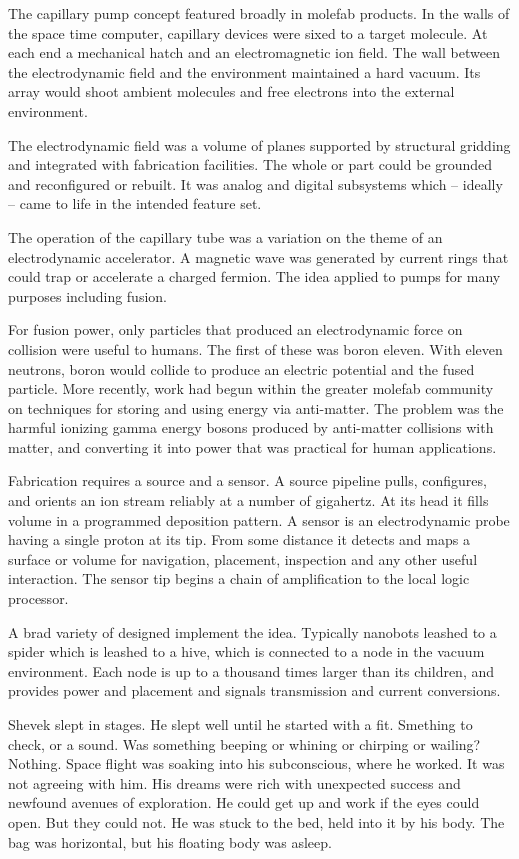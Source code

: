 The capillary pump concept featured broadly in molefab products.  In
the walls of the space time computer, capillary devices were sixed to
a target molecule.  At each end a mechanical hatch and an
electromagnetic ion field.  The wall between the electrodynamic field
and the environment maintained a hard vacuum.  Its array would shoot
ambient molecules and free electrons into the external environment.

The electrodynamic field was a volume of planes supported by
structural gridding and integrated with fabrication facilities.  The
whole or part could be grounded and reconfigured or rebuilt.  It was
analog and digital subsystems which -- ideally -- came to life in the
intended feature set.

The operation of the capillary tube was a variation on the theme of an
electrodynamic accelerator.  A magnetic wave was generated by current
rings that could trap or accelerate a charged fermion.  The idea
applied to pumps for many purposes including fusion.

For fusion power, only particles that produced an electrodynamic force
on collision were useful to humans.  The first of these was boron
eleven.  With eleven neutrons, boron would collide to produce an
electric potential and the fused particle.  More recently, work had
begun within the greater molefab community on techniques for storing
and using energy via anti-matter.  The problem was the harmful
ionizing gamma energy bosons produced by anti-matter collisions with
matter, and converting it into power that was practical for human
applications.

Fabrication requires a source and a sensor.  A source pipeline pulls,
configures, and orients an ion stream reliably at a number of
gigahertz.  At its head it fills volume in a programmed deposition
pattern.  A sensor is an electrodynamic probe having a single proton
at its tip.  From some distance it detects and maps a surface or
volume for navigation, placement, inspection and any other useful
interaction.  The sensor tip begins a chain of amplification to the
local logic processor.

A brad variety of designed implement the idea.  Typically nanobots
leashed to a spider which is leashed to a hive, which is connected to
a node in the vacuum environment.  Each node is up to a thousand times
larger than its children, and provides power and placement and signals
transmission and current conversions.

Shevek slept in stages.  He slept well until he started with a fit.
Smething to check, or a sound.  Was something beeping or whining or
chirping or wailing?  Nothing.  Space flight was soaking into his
subconscious, where he worked.  It was not agreeing with him.  His
dreams were rich with unexpected success and newfound avenues of
exploration.  He could get up and work if the eyes could open.  But
they could not.  He was stuck to the bed, held into it by his body.
The bag was horizontal, but his floating body was asleep.

